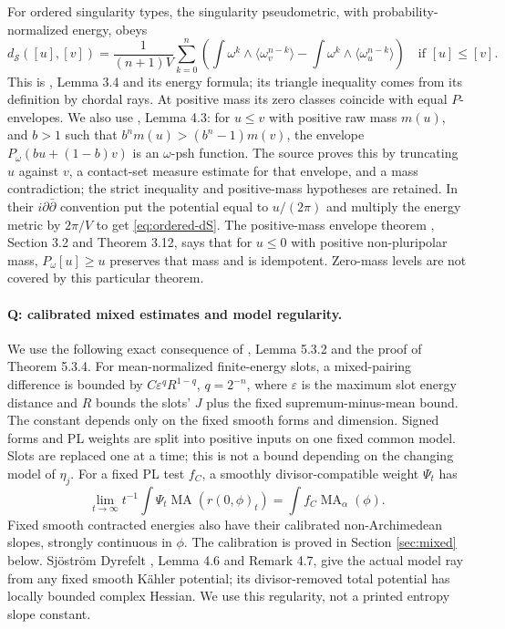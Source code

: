 \documentclass[11pt]{article}
\newcommand{\MA}{\operatorname{MA}}
\theoremstyle{remark}\newtheorem{remark}[theorem]{Remark}
\begin{document}
For ordered singularity types, the singularity pseudometric, with
probability-normalized energy, obeys
\begin{equation}\label{eq:ordered-dS}
 d_{\mathcal S}([u],[v])=\frac1{(n+1)V}\sum_{k=0}^n
 \left(\int\omega^k\wedge\langle\omega_v^{n-k}\rangle
 -\int\omega^k\wedge\langle\omega_u^{n-k}\rangle\right)
 \quad\text{if }[u]\leq[v].
\end{equation}
This is \cite{DDNLmetric}, Lemma 3.4 and its energy formula; its
triangle inequality comes from its definition by chordal rays.
At positive mass its zero classes coincide with equal $P$-envelopes.
We also use \cite{DDNLmetric}, Lemma 4.3: for $u\leq v$ with
positive raw mass $m(u)$, and $b>1$ such that
$b^n m(u)>(b^n-1)m(v)$, the envelope
$P_\omega(bu+(1-b)v)$ is an $\omega$-psh function.
The source proves this by truncating $u$ against $v$, a contact-set
measure estimate for that envelope, and a mass contradiction;
the strict inequality and positive-mass hypotheses are retained.
In their $i\partial\bar\partial$ convention put the potential equal
to $u/(2\pi)$ and multiply the energy metric by $2\pi/V$ to get
\eqref{eq:ordered-dS}. The positive-mass envelope theorem
\cite{DDNL}, Section 3.2 and Theorem 3.12, says that for $u\leq0$
with positive non-pluripolar mass, $P_\omega[u]\geq u$ preserves
that mass and is idempotent. Zero-mass levels are not covered by
this particular theorem.

\paragraph{Q: calibrated mixed estimates and model regularity.}
We use the following exact consequence of \cite{MP}, Lemma 5.3.2
and the proof of Theorem 5.3.4. For mean-normalized finite-energy
slots, a mixed-pairing difference is bounded by
$C\varepsilon^q R^{1-q}$, $q=2^{-n}$, where $\varepsilon$ is the
maximum slot energy distance and $R$ bounds the slots' $J$ plus the
fixed supremum-minus-mean bound. The constant depends only on the
fixed smooth forms and dimension. Signed forms and PL weights are
split into positive inputs on one fixed common model.
Slots are replaced one at a time; this is not a bound depending on
the changing model of $\eta_j$.
For a fixed PL test $f_C$, a smoothly divisor-compatible weight
$\Psi_t$ has
\begin{equation}\label{eq:pairing-slope}
 \lim_{t\to\infty}t^{-1}\int\Psi_t\MA(r(0,\phi)_t)
       =\int f_C\MA_\alpha(\phi).
\end{equation}
Fixed smooth contracted energies also have their calibrated
non-Archimedean slopes, strongly continuous in $\phi$.
The calibration is proved in Section \ref{sec:mixed} below.
Sj\"ostr\"om Dyrefelt \cite{SD}, Lemma 4.6 and Remark 4.7,
give the actual model ray from any fixed smooth K\"ahler potential;
its divisor-removed total potential has locally bounded complex
Hessian. We use this regularity, not a printed entropy slope constant.
\end{document}
